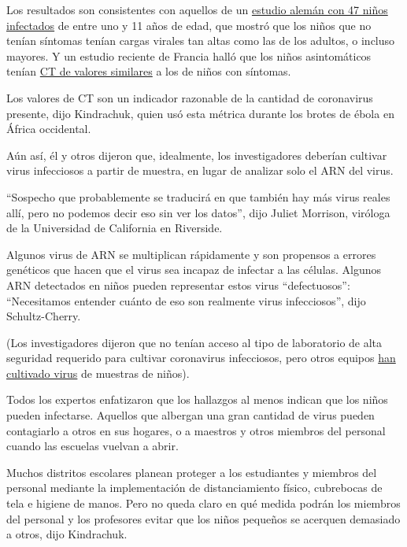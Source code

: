 Los resultados son consistentes con aquellos de un
\href{https://www.nytimes3xbfgragh.onion/2020/05/05/health/coronavirus-children-transmission-school.html}{estudio
alemán con 47 niños infectados} de entre uno y 11 años de edad, que
mostró que los niños que no tenían síntomas tenían cargas virales tan
altas como las de los adultos, o incluso mayores. Y un estudio reciente
de Francia halló que los niños asintomáticos tenían
\href{https://academic.oup.com/cid/article/doi/10.1093/cid/ciaa1044/5876373}{CT
de valores similares} a los de niños con síntomas.

Los valores de CT son un indicador razonable de la cantidad de
coronavirus presente, dijo Kindrachuk, quien usó esta métrica durante
los brotes de ébola en África occidental.

Aún así, él y otros dijeron que, idealmente, los investigadores deberían
cultivar virus infecciosos a partir de muestra, en lugar de analizar
solo el ARN del virus.

``Sospecho que probablemente se traducirá en que también hay más virus
reales allí, pero no podemos decir eso sin ver los datos'', dijo Juliet
Morrison, viróloga de la Universidad de California en Riverside.

Algunos virus de ARN se multiplican rápidamente y son propensos a
errores genéticos que hacen que el virus sea incapaz de infectar a las
células. Algunos ARN detectados en niños pueden representar estos virus
``defectuosos'': ``Necesitamos entender cuánto de eso son realmente
virus infecciosos'', dijo Schultz-Cherry.

(Los investigadores dijeron que no tenían acceso al tipo de laboratorio
de alta seguridad requerido para cultivar coronavirus infecciosos, pero
otros equipos \href{https://pubmed.ncbi.nlm.nih.gov/32603290/}{han
cultivado virus} de muestras de niños).

Todos los expertos enfatizaron que los hallazgos al menos indican que
los niños pueden infectarse. Aquellos que albergan una gran cantidad de
virus pueden contagiarlo a otros en sus hogares, o a maestros y otros
miembros del personal cuando las escuelas vuelvan a abrir.

Muchos distritos escolares planean proteger a los estudiantes y miembros
del personal mediante la implementación de distanciamiento físico,
cubrebocas de tela e higiene de manos. Pero no queda claro en qué medida
podrán los miembros del personal y los profesores evitar que los niños
pequeños se acerquen demasiado a otros, dijo Kindrachuk.

